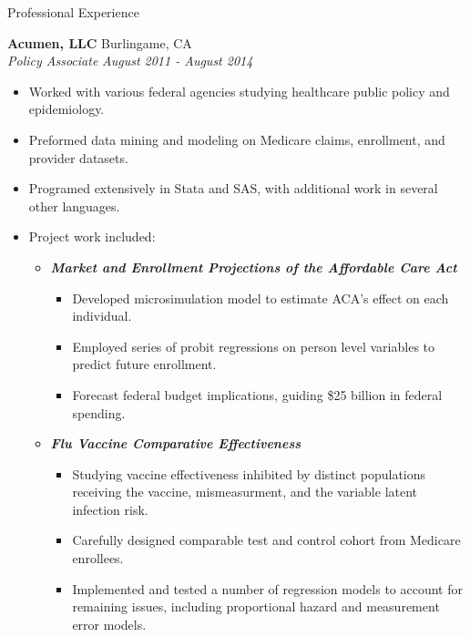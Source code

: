 \documentclass{resume} %
\begin{document}

\begin{rSection}{Professional Experience}

\vspace{0.2em}

{\bf Acumen, LLC} \hfill Burlingame, CA \\
{\em Policy Associate} \hfill {\em August 2011 - August 2014} \vspace{0.3em} 
\vspace{-0.2em}
\begin{itemize} \itemsep -0.2em
    \item Worked with various federal agencies studying healthcare public policy and epidemiology.
	\item Preformed data mining and modeling on Medicare claims, enrollment, and provider datasets.
    \item Programed extensively in Stata and SAS, with additional work in several other languages.
    \item Project work included:
    \begin{itemize} \itemsep -0.2em
    	\item {\bf \em Market and Enrollment Projections of the Affordable Care 		Act}
        \begin{itemize} \itemsep -0.2em
    		\item Developed microsimulation model to estimate ACA's effect on each individual. 	
            \item Employed series of probit regressions on person level variables to predict future enrollment. 
            \item Forecast federal budget implications, guiding \$25 billion in federal spending.
    	\end{itemize}
    	\item {\bf \em Flu Vaccine Comparative Effectiveness}
        \begin{itemize} \itemsep -0.2em
            \item Studying vaccine effectiveness inhibited by distinct populations receiving the vaccine, mismeasurment, and the variable latent infection risk. 
    		\item Carefully designed comparable test and control cohort from Medicare enrollees.
            \item Implemented and tested a number of regression models to account for remaining issues, including proportional hazard and measurement error models. 
    	\end{itemize}


\end{itemize}
\end{itemize}
\end{rSection}
\end{document}
